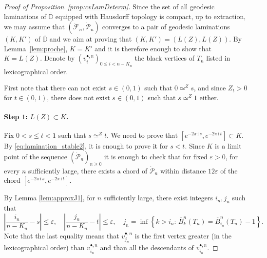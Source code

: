 \documentclass[10pt]{amsart}
\theoremstyle{definition}\newtheorem{defi}[theo]{Definition}\newtheorem{rema}[theo]{Remark}\newtheorem{exam}[theo]{Example}\newtheorem{exem}[theo]{Example}\newtheorem{nota}[theo]{Notation}
\newcommand{\D}{\mathbb{D}}
\def\eps{\varepsilon}
\def\dFn{\dot{\mathcal{F}}_{n}}
\def\dPn{\dot{\mathcal{P}}_{n}}
\def\oB{\overline{B}}
\renewcommand{\epsilon}{\varepsilon}
\begin{document}
\begin{proof}[Proof of Proposition~\ref{prop:cvLamDeterm}]
Since the set of all geodesic laminations of $\overline{\D}$ equipped with Hausdorff topology is compact, up to extraction,
we may assume that $(\dFn, \dPn)$  converges to a pair of geodesic laminations $(K,K')$ of $\overline{\D}$ and we aim at proving that $(K,K')=( L(Z), L(Z))$. By Lemma~\ref{lem:proche}, $K=K'$ and it is therefore enough to show that $K=L(Z)$. Denote by $(v^{\bullet,n}_{i})_{0 \leq i < n-K_{n}}$ the black vertices of $T_{n}$ listed in lexicographical order.


First note that there can not exist $s \in (0,1)$ such that $0 \simeq^{Z} s$,
and since $Z_{t}>0$ for $t \in (0,1)$, there does not exist $s \in (0,1)$ such that $ s \simeq^{Z} 1$ either.

\paragraph*{Step $1$: $L(Z) \subset K$.}  Fix $0 < s \le t < 1$ such that  $s \simeq^Z t$.
We need to prove that $[e^{-2\pi\, \textrm{i}\, s}, e^{-2\pi\, \textrm{i}\, t}] \subset K$.
By \eqref{eq:lamination_stable2}, it is enough to prove it for $s<t$.
Since $K$ is a limit point of the sequence $(\dPn)_{n \ge 0}$
it is enough to check that for fixed $\epsilon>0$, for every $n$ sufficiently large,
there exists a chord of $\dPn$  within distance $12\epsilon$ of the chord $[e^{-2\pi\, \textrm{i}\, s}, e^{-2\pi\, \textrm{i}\, t}]$.

 By Lemma \ref{lem:approxJ1}, for $n$ sufficiently large, there exist integers $i_{n},j_{n}$ such that
\begin{equation}
\label{eq:injn}
    \left|\frac{i_{n}}{n-K_n} -s \right|  \le \eps, \quad \left|\frac{j_{n}}{n-K_n} -t \right|  \le \eps, \quad
    j_{n}= \inf \left\{k>i_{n}: \,  \oB^{n}_k(T_n)=\oB^{n}_{i_{n}}(T_n)-1 \right\}.
\end{equation}
Note that the last equality means that $v^{\bullet,n}_{j_{n}}$ is the first vertex greater (in the lexicographical order) than $v^{\bullet,n}_{i_{n}}$ and than all the descendants of $v^{\bullet,n}_{i_{n}}$.



\end{proof}
\end{document}
